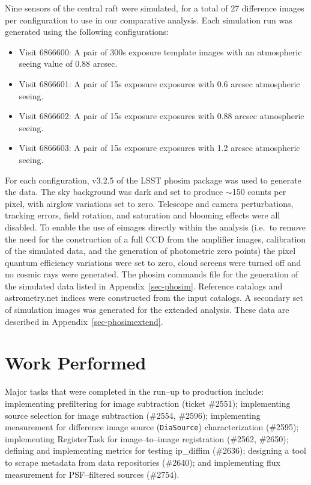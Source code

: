 \documentclass[prd, nofootinbib, floatfix, 11pt,tightenlines,times]{article}
\begin{document}
Nine sensors of the central raft were simulated, for a total of 27
difference images per configuration to use in our comparative
analysis.  Each simulation run was generated using the following
configurations:
\begin{itemize}
\item Visit 6866600: A pair of 300s exposure template images with
  an atmospheric seeing value of 0.88 arcsec.
\item Visit 6866601: A pair of 15s exposure exposures with 0.6
 arcsec atmospheric seeing.
\item Visit 6866602: A pair of 15s exposure exposures with 0.88
 arcsec atmospheric seeing.
\item Visit 6866603: A pair of 15s exposure exposures with 1.2
 arcsec atmospheric seeing.
\end{itemize}

For each configuration, v3.2.5 of the LSST phosim package was used to
generate the data. The sky background was dark and set to produce
$\sim$150 counts per pixel, with airglow variations set to
zero. Telescope and camera perturbations, tracking errors, field
rotation, and saturation and blooming effects were all disabled. To
enable the use of eimages directly within the analysis (i.e.\ to
remove the need for the construction of a full CCD from the amplifier
images, calibration of the simulated data, and the generation of
photometric zero points) the pixel quantum efficiency variations were
set to zero, cloud screens were turned off and no cosmic rays were
generated.  The phosim commands file for the generation of the
simulated data listed in Appendix~\ref{sec-phosim}.  Reference
catalogs and astrometry.net indices were constructed from the input
catalogs.  A secondary set of simulation images was generated for the
extended analysis.  These data are described in
Appendix~\ref{sec-phosimextend}.

\section{Work Performed}

Major tasks that were completed in the run--up to production include:
implementing prefiltering for image subtraction (ticket \#2551);
implementing source selection for image subtraction (\#2554, \#2596);
implementing measurement for difference image source ({\tt DiaSource})
characterization (\#2595); implementing RegisterTask for
image--to--image registration (\#2562, \#2650); defining and
implementing metrics for testing ip\_diffim (\#2636); designing a tool
to scrape metadata from data repositories (\#2640); and implementing
flux measurement for PSF--filtered sources (\#2754).
\end{document}
